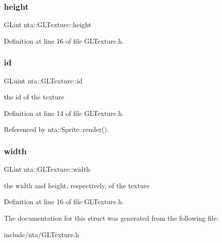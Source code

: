 \subsubsection{\texorpdfstring{height}{height}}
{\footnotesize\ttfamily G\+Lint nta\+::\+G\+L\+Texture\+::height}



Definition at line 16 of file G\+L\+Texture.\+h.

\mbox{\label{structnta_1_1GLTexture_aaf0d536088f4b1062d996679b217c0f9}} 
\subsubsection{\texorpdfstring{id}{id}}
{\footnotesize\ttfamily G\+Luint nta\+::\+G\+L\+Texture\+::id}



the id of the texture 



Definition at line 14 of file G\+L\+Texture.\+h.



Referenced by nta\+::\+Sprite\+::render().

\mbox{\label{structnta_1_1GLTexture_a8f4d13ab2b19b700f76334c46458ac48}} 
\subsubsection{\texorpdfstring{width}{width}}
{\footnotesize\ttfamily G\+Lint nta\+::\+G\+L\+Texture\+::width}



the width and height, respectively, of the texture 



Definition at line 16 of file G\+L\+Texture.\+h.



The documentation for this struct was generated from the following file\+:\begin{DoxyCompactItemize}
\item 
include/nta/G\+L\+Texture.\+h\end{DoxyCompactItemize}
